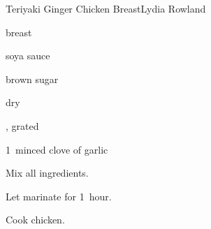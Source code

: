 \begin{recipe}{Teriyaki Ginger Chicken Breast}{Lydia Rowland}{}

\begin{ingredients}
\item {}  breast
\item {} soya sauce
\item {} brown sugar
\item {} dry 
\item \tp{\half} , grated 
\item 1~minced clove of garlic
\end{ingredients}

\begin{directions}
\item Mix all ingredients.
\item Let marinate for 1~hour.
\item Cook chicken.
\end{directions}

\end{recipe}
